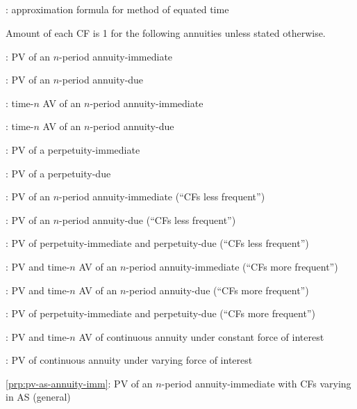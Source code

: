 \subsection*{}
\item {}: approximation formula for method of equated time

\begin{note}
Amount of each CF is 1 for the following annuities unless stated otherwise.
\end{note}
\item {}: PV of an \(n\)-period annuity-immediate
\item {}: PV of an \(n\)-period annuity-due
\item {}: time-\(n\) AV of an \(n\)-period annuity-immediate
\item {}: time-\(n\) AV of an \(n\)-period annuity-due
\item {}: PV of a perpetuity-immediate
\item {}: PV of a perpetuity-due
\item {}: PV of an \(n\)-period annuity-immediate (``CFs less frequent'')
\item {}: PV of an \(n\)-period annuity-due (``CFs less frequent'')
\item {}: PV of perpetuity-immediate and perpetuity-due (``CFs less frequent'')
\item {}: PV and time-\(n\) AV of an \(n\)-period annuity-immediate (``CFs more frequent'')
\item {}: PV and time-\(n\) AV of an \(n\)-period annuity-due (``CFs more frequent'')
\item {}: PV of perpetuity-immediate and perpetuity-due (``CFs more frequent'')
\item {}: PV and time-\(n\) AV of continuous annuity under constant force of interest
\item {}: PV of continuous annuity under varying force of interest
\item \cref{prp:pv-as-annuity-imm}: PV of an \(n\)-period annuity-immediate with CFs varying in AS (general)
